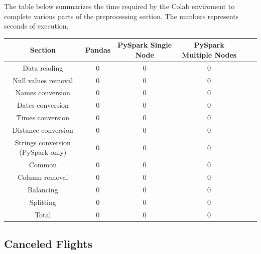 \documentclass[
	letterpaper, %
	10pt, %
]{class}
\begin{document}
The table below summarizes the time required by the Colab enviroment to complete various parts of the preprocessing section.
The numbers represents seconds of execution.

\begin{center}
    \begin{tabular}{ |c|c|c|c|c|c| }
        \hline
        Section                           & Pandas & PySpark Single Node & PySpark Multiple Nodes \\
        \hline
        Data reading                      & 0      & 0                   & 0                      \\
        Null values removal               & 0      & 0                   & 0                      \\
        Names conversion                  & 0      & 0                   & 0                      \\
        Dates conversion                  & 0      & 0                   & 0                      \\
        Times conversion                  & 0      & 0                   & 0                      \\
        Distance conversion               & 0      & 0                   & 0                      \\
        Strings conversion (PySpark only) & 0      & 0                   & 0                      \\
        Common                            & 0      & 0                   & 0                      \\
        Column removal                    & 0      & 0                   & 0                      \\
        Balancing                         & 0      & 0                   & 0                      \\
        Splitting                         & 0      & 0                   & 0                      \\
        Total                             & 0      & 0                   & 0                      \\

        \hline
    \end{tabular}
\end{center}


\subsection{Canceled Flights}
\end{document}
